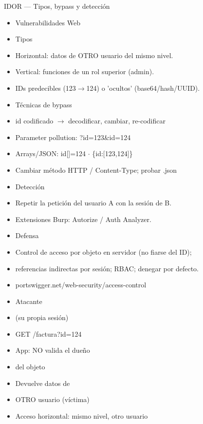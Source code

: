 \documentclass[aspectratio=169,10pt]{beamer}
\begin{document}
\begin{frame}[allowframebreaks]{IDOR --- Tipos, bypass y detección}
\small
  \begin{itemize}
  \item Vulnerabilidades Web
  \item Tipos
  \item Horizontal: datos de OTRO usuario del mismo nivel.
  \item Vertical: funciones de un rol superior (admin).
  \item IDs predecibles (123$\rightarrow$124) o 'ocultos' (base64/hash/UUID).
  \item Técnicas de bypass
  \item id codificado $\rightarrow$ decodificar, cambiar, re-codificar
  \item Parameter pollution: ?id=123\&id=124
  \item Arrays/JSON: id[]=124 $\cdot$ \{\textquotedbl{}id\textquotedbl{}:[123,124]\}
  \item Cambiar método HTTP / Content-Type; probar .json
  \item Detección
  \item Repetir la petición del usuario A con la sesión de B.
  \item Extensiones Burp: Autorize / Auth Analyzer.
  \item Defensa
  \item Control de acceso por objeto en servidor (no fiarse del ID);
  \item referencias indirectas por sesión; RBAC; denegar por defecto.
  \item portswigger.net/web-security/access-control
  \item Atacante
  \item (su propia sesión)
  \item GET /factura?id=124
  \item App: NO valida el dueño
  \item del objeto
  \item Devuelve datos de
  \item OTRO usuario (víctima)
  \item Acceso horizontal: mismo nivel, otro usuario
  \end{itemize}
\end{frame}
\end{document}
